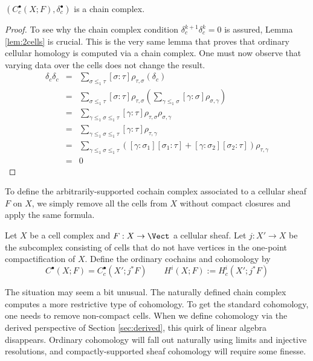 \begin{lem}
 $(C^{\bullet}_c(X;F),\delta^{\bullet}_c)$ is a chain complex.
\end{lem}
\begin{proof}
To see why the chain complex condition $\delta_c^{k+1}\delta_c^{k}=0$ is assured, Lemma \ref{lem:2cells} is crucial. This is the very same lemma that proves that ordinary cellular homology is computed via a chain complex. One must now observe that varying data over the cells does not change the result.
\begin{eqnarray*}
 \delta_c\delta_c &=& \sum_{\sigma\leq_1\tau} [\sigma:\tau]\rho_{\tau,\sigma}(\delta_c) \\
 &=& \sum_{\sigma\leq_1\tau} [\sigma:\tau]\rho_{\tau,\sigma}(\sum_{\gamma\leq_1 \sigma} [\gamma:\sigma]\rho_{\sigma,\gamma}) \\
 &=& \sum_{\gamma\leq_1\sigma\leq_1\tau} [\gamma:\tau] \rho_{\tau,\sigma}\rho_{\sigma,\gamma} \\
 &=& \sum_{\gamma\leq_1\sigma\leq_1\tau} [\gamma:\tau] \rho_{\tau,\gamma} \\
 &=& \sum_{\gamma\leq_1\sigma\leq_1\tau} ([\gamma:\sigma_1][\sigma_1:\tau]+[\gamma:\sigma_2][\sigma_2:\tau]) \rho_{\tau,\gamma} \\
 &=& 0
\end{eqnarray*}
\end{proof}

To define the arbitrarily-supported cochain complex associated to a cellular sheaf $F$ on $X$, we simply remove all the cells from $X$ without compact closures and apply the same formula.

\begin{defn}
    Let $X$ be a cell complex and $F:X\to\Vect$ a cellular sheaf. Let $j:X'\to X$ be the subcomplex consisting of cells that do not have vertices in the one-point compactification of $X$. Define the ordinary cochains and cohomology by
\[
	C^{\bullet}(X;F)=C^{\bullet}_c(X';j^*F) \qquad H^i(X;F):=H^i_c(X';j^*F)
\]
\end{defn}

The situation may seem a bit unusual. The naturally defined chain complex computes a more restrictive type of cohomology. To get the standard cohomology, one needs to remove non-compact cells. When we define cohomology via the derived perspective of Section \ref{sec:derived}, this quirk of linear algebra disappears. Ordinary cohomology will fall out naturally using limits and injective resolutions, and compactly-supported sheaf cohomology will require some finesse.


